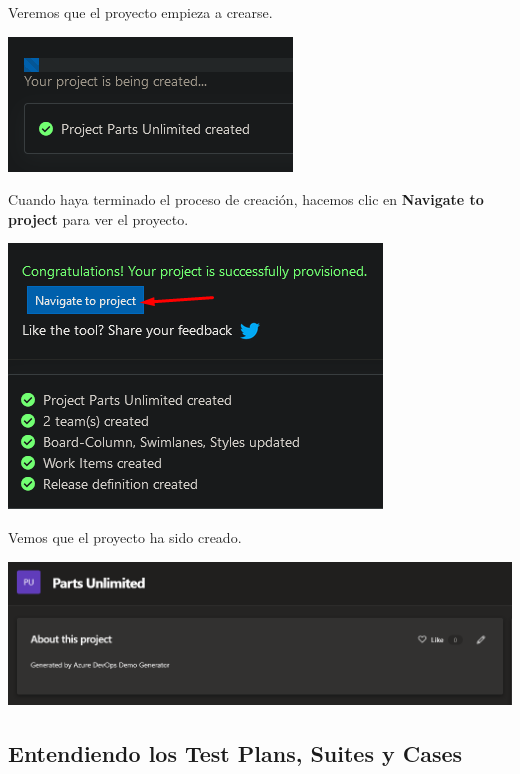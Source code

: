 \documentclass{elsarticle}
\begin{document}
Veremos que el proyecto empieza a crearse.
\begin{center}
	\includegraphics{img/Screenshot_14.png}
\end{center}

Cuando haya terminado el proceso de creación, hacemos clic en \textbf{Navigate to project} para ver el proyecto.
\begin{center}
	\includegraphics{img/Screenshot_15.png}
\end{center}

Vemos que el proyecto ha sido creado.
\begin{center}
	\includegraphics[width=\columnwidth]{img/Screenshot_16.png}
\end{center}

\subsection{Entendiendo los Test Plans, Suites y Cases}
\end{document}
